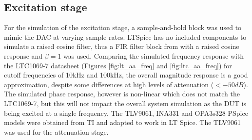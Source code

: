 \subsection{Excitation stage}
For the simulation of the excitation stage, a sample-and-hold block was used to mimic the DAC at varying sample rates. LTSpice has no included components to simulate a raised cosine filter, thus a FIR filter block from \cite{FilterManual} with a raised cosine response and $\beta = 1$ was used. Comparing the simulated frequency response with the LTC1069-7 datasheet (Figures \ref{fig:lt_aa_freq} and \ref{fig:ltc_aa_freq}) for cutoff frequencies of 10kHz and 100kHz, the overall magnitude response is a good approximation, despite some differences at high levels of attenuation ($<-50dB$). The simulated phase response, however is non-linear which does not match the LTC1069-7, but this will not impact the overall system simulation as the DUT is being excited at a single frequency. The TLV9061, INA331 and OPA3s328 PSpice models were obtained from TI and adapted to work in LT Spice. The TLV9061 was used for the attenuation stage.

